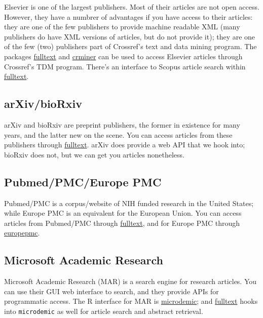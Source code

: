 \documentclass[author-year, review, 11pt]{components/elsarticle} %
\begin{document}
Elsevier is one of the largest publishers. Most of their articles are
not open access. However, they have a numbrer of advantages if you have
access to their articles: they are one of the few publishers to provide
machine readable XML (many publishers do have XML versions of articles,
but do not provide it); they are one of the few (two) publishers part of
Crossref's text and data mining program. The packages
\href{https://github.com/ropensci/fulltext}{fulltext} and
\href{https://github.com/ropensci/crminer}{crminer} can be used to
access Elsevier articles through Crossref's TDM program. There's an
interface to Scopus article search within
\href{https://github.com/ropensci/fulltext}{fulltext}.

\hypertarget{arxivbiorxiv}{%
\subsection{arXiv/bioRxiv}\label{arxivbiorxiv}}

arXiv and bioRxiv are preprint publishers, the former in existence for
many years, and the latter new on the scene. You can access articles
from these publishers through
\href{https://github.com/ropensci/fulltext}{fulltext}. arXiv does
provide a web API that we hook into; bioRxiv does not, but we can get
you articles nonetheless.

\hypertarget{pubmedpmceurope-pmc}{%
\subsection{Pubmed/PMC/Europe PMC}\label{pubmedpmceurope-pmc}}

Pubmed/PMC is a corpus/website of NIH funded research in the United
States; while Europe PMC is an equivalent for the European Union. You
can access articles from Pubmed/PMC through
\href{https://github.com/ropensci/fulltext}{fulltext}, and for Europe
PMC through \href{https://github.com/ropensci/europepmc}{europepmc}.

\hypertarget{microsoft-academic-research}{%
\subsection{Microsoft Academic
Research}\label{microsoft-academic-research}}

Microsoft Academic Research (MAR) is a search engine for research
articles. You can use their GUI web interface to search, and they
provide APIs for programmatic access. The R interface for MAR is
\href{https://github.com/ropensci/microdemic}{microdemic}; and
\href{https://github.com/ropensci/fulltext}{fulltext} hooks into
\texttt{microdemic} as well for article search and abstract retrieval.
\end{document}
